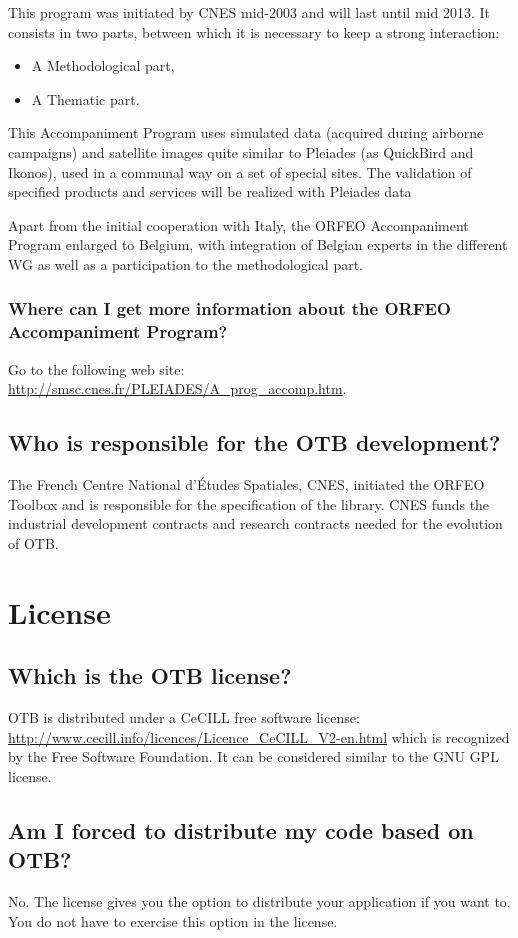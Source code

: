 This program was initiated by CNES mid-2003 and will last until mid 2013.
It consists in two parts, between which it is necessary to keep a strong interaction:
\begin{itemize}
\item A Methodological part,
\item A Thematic part.
\end{itemize}

This Accompaniment Program uses simulated data (acquired during airborne campaigns) and satellite images quite similar to Pleiades (as QuickBird and Ikonos), used in a communal way on a set of special sites. The validation of specified products and services will be realized with Pleiades data

Apart from the initial cooperation with Italy, the ORFEO Accompaniment
Program enlarged to Belgium, with integration of Belgian experts in
the different WG as well as a participation to the methodological
part.

\subsubsection{Where can I get more information about the ORFEO
  Accompaniment Program?}
Go to the following web site:
\url{http://smsc.cnes.fr/PLEIADES/A_prog_accomp.htm}.

\subsection{Who is responsible for the OTB development?}
The French Centre National d'\'Etudes Spatiales, CNES, initiated the ORFEO
Toolbox and is responsible for the specification of the library. CNES
funds the industrial development contracts and research contracts
needed for the evolution of OTB.

\section{License}
\subsection{Which is the OTB license?}
OTB is distributed under a CeCILL free software license:\\
\url{http://www.cecill.info/licences/Licence_CeCILL_V2-en.html} which 
is recognized by the Free Software Foundation. It can be considered 
similar to the GNU GPL license. 

\subsection{Am I forced to distribute my code based on OTB?}
No. The license gives you the option to distribute your application if
you want to. You do not have to exercise this option in the license.

